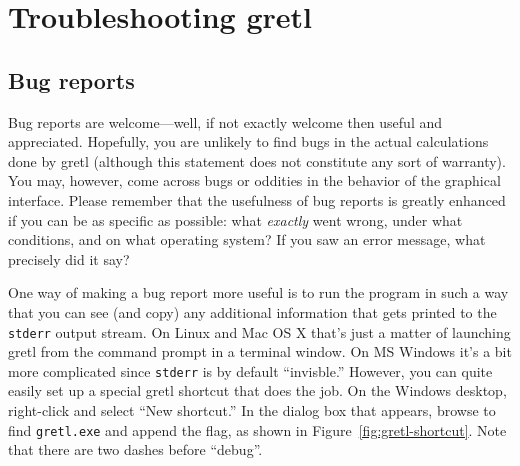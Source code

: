 \chapter{Troubleshooting gretl}
\label{chap:trouble}

\section{Bug reports}
\label{trouble-bugs}

Bug reports are welcome---well, if not exactly welcome then useful
and appreciated. Hopefully, you are unlikely to find bugs in the
actual calculations done by gretl (although this statement does
not constitute any sort of warranty). You may, however, come across
bugs or oddities in the behavior of the graphical interface.  Please
remember that the usefulness of bug reports is greatly enhanced if you
can be as specific as possible: what \emph{exactly} went wrong, under
what conditions, and on what operating system?  If you saw an error
message, what precisely did it say?

One way of making a bug report more useful is to run the program in
such a way that you can see (and copy) any additional information that
gets printed to the \texttt{stderr} output stream. On Linux and Mac
OS X that's just a matter of launching gretl from the command
prompt in a terminal window. On MS Windows it's a bit more complicated
since \texttt{stderr} is by default ``invisble.'' However, you can
quite easily set up a special gretl shortcut that does the job.
On the Windows desktop, right-click and select ``New shortcut.'' In the
dialog box that appears, browse to find \texttt{gretl.exe} and
append the  flag, as shown in
Figure~\ref{fig:gretl-shortcut}.  Note that there are two dashes
before ``debug''.

